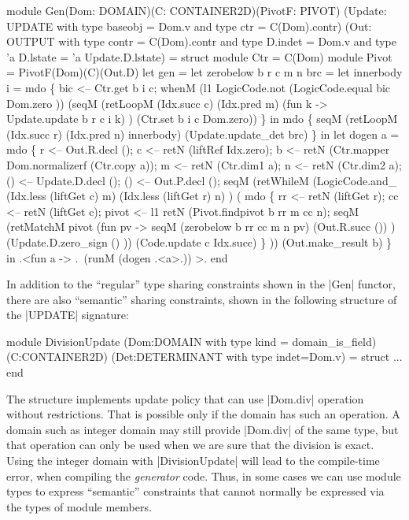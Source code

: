 \documentclass{llncs}
\begin{document}
\begin{figure*}
\begin{code}
module Gen(Dom: DOMAIN)(C: CONTAINER2D)(PivotF: PIVOT)
          (Update: UPDATE with type baseobj = Dom.v and type ctr = C(Dom).contr)
          (Out: OUTPUT with type contr = C(Dom).contr and type D.indet = Dom.v 
                        and type 'a D.lstate = 'a Update.D.lstate) = struct
    module Ctr = C(Dom)
    module Pivot = PivotF(Dom)(C)(Out.D)
    let gen =
      let zerobelow b r c m n brc =
        let innerbody i = mdo \{
            bic <-- Ctr.get b i c;
            whenM (l1 LogicCode.not (LogicCode.equal bic Dom.zero ))
                (seqM (retLoopM (Idx.succ c) (Idx.pred m)
                          (fun k -> Update.update b r c i k) )
                      (Ctr.set b i c Dom.zero)) \} in 
        mdo \{
              seqM (retLoopM (Idx.succ r) (Idx.pred n) innerbody) 
                   (Update.update_det brc) \} in
      let dogen a = mdo \{
          r <-- Out.R.decl ();
          c <-- retN (liftRef Idx.zero);
          b <-- retN (Ctr.mapper Dom.normalizerf (Ctr.copy a));
          m <-- retN (Ctr.dim1 a);
          n <-- retN (Ctr.dim2 a);
          () <-- Update.D.decl ();
          () <-- Out.P.decl ();
          seqM 
            (retWhileM (LogicCode.and_ (Idx.less (liftGet c) m)
                                       (Idx.less (liftGet r) n) )
               ( mdo \{
               rr <-- retN (liftGet r);
               cc <-- retN (liftGet c);
               pivot <-- l1 retN (Pivot.findpivot b rr m cc n);
               seqM (retMatchM pivot (fun pv -> 
                        seqM (zerobelow b rr cc m n pv)
                             (Out.R.succ ()) )
                        (Update.D.zero_sign () ))
                    (Code.update c Idx.succ) \} ))
            (Out.make_result b) \} in
    .<fun a -> .~(runM (dogen .<a>.)) >.
end
\end{code}
\end{figure*}

In addition to the ``regular'' type sharing constraints shown in the
|Gen| functor, there are also ``semantic'' sharing constraints, shown
in the following structure of the |UPDATE| signature:

\begin{code}
module DivisionUpdate
  (Dom:DOMAIN with type kind = domain_is_field)
  (C:CONTAINER2D)
  (Det:DETERMINANT with type indet=Dom.v) = struct ... end
\end{code}

The structure implements update policy that can use |Dom.div| operation without
restrictions. That is possible only if the domain has such an
operation. A domain such as integer domain may still provide |Dom.div|
of the same type, but that operation can only be used when we are sure
that the division is exact. Using the integer domain with
|DivisionUpdate| will lead to the compile-time error, when compiling
the \emph{generator} code. Thus, in some cases we can use module types
to express ``semantic'' constraints that cannot normally be expressed
via the types of module members.
\end{document}
